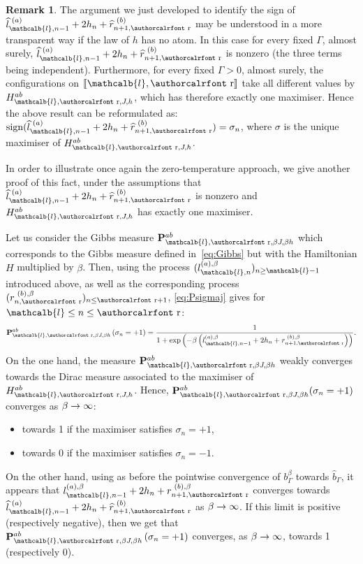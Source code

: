 \documentclass[10pt]{amsart}
\theoremstyle{definition}\newtheorem{defi}[theo]{Definition}\newtheorem{rema}[theo]{Remark}\newtheorem{exam}[theo]{Example}\newtheorem{exem}[theo]{Example}\newtheorem{nota}[theo]{Notation}
\newcommand{\mathcalc}[1]{\text{\authorcalrfont #1}}
\newcommand{\bP}{\mathbf{P}}
\newcommand{\gb}{\beta}
\newcommand{\gG}{\Gamma}
\newcommand{\gs}{\sigma}
\newcommand{\ls}{\widehat{l}}
\newcommand{\rs}{\widehat{r}}
\DeclareMathOperator{\sign}{\mathrm{sign}}
\renewcommand{\ell}{\mathcalb{l}}
\newcommand{\err}{\mathcalc{r}}
\newcommand{\llbracket}{\mathopen{[\mkern -2.7mu[}}
\newcommand{\rrbracket}{\mathclose{]\mkern -2.7mu]}}
\newcommand{\lbra}{\llbracket}
\newcommand{\rbra}{\rrbracket}
\renewcommand*{\to}{\mathchoice{\longrightarrow}{\rightarrow}{\rightarrow}{\rightarrow}}
\begin{document}
\begin{rema}
The argument we just developed to identify the sign of $ \ls_{\ell, n-1}^{\,\,(a)}+2 h_n + \rs_{n+1, \err}^{\,\, (b)}$ may be understood in a more transparent way if the law of $h$ has no atom. In this case for every fixed $\gG$, almost surely, $\ls_{\ell, n-1}^{\,\,(a)}+2 h_n + \rs_{n+1, \err}^{\,\,(b)}$ is nonzero (the three terms being independent). Furthermore, for every fixed $\gG>0$, almost surely, the configurations on $\lbra\ell, \err\rbra$ take all different values by $H_{\ell, \err, J, h}^{ab}$, which has therefore exactly one maximiser. Hence the above result can be reformulated as: $\sign(\ls_{\ell, n-1}^{\,\,(a)}+2 h_n + \rs_{n+1, \err}^{\,\,(b)})=\sigma_n$, where $\sigma$ is the unique maximiser of $H_{\ell, \err, J, h}^{ab}$.

In order to illustrate once again the zero-temperature approach, we give another proof of this fact, under the assumptions that $\ls_{\ell, n-1}^{\,\,(a)}+2 h_n + \rs_{n+1, \err}^{\,\,(b)}$ is nonzero and $H_{\ell, \err, J, h}^{ab}$ has exactly one maximiser.

Let us consider the Gibbs measure $\bP_{\ell, \err, \beta J, \beta h}^{ab}$ which corresponds to the Gibbs measure defined in~\eqref{eq:Gibbs} but with the Hamiltonian $H$ multiplied by $\beta$. Then, using the process $(l_{\ell, n}^{(a), \beta})_{n\ge \ell-1}$ introduced above, as well as the corresponding process $(r_{n,\err}^{\,\,(b), \beta})_{n\le \err+1}$, \eqref{eq:Psigmaj} gives for $\ell\le n\le \err$:
\begin{equation}\label{eq:Psigmajbeta}
\bP_{\ell, \err, \beta J, \beta h}^{ab}\left(\gs_n=+1\right)=
\frac 1 {1+ \exp\left(-\gb\left(l_{\ell,n-1}^{(a),\gb} +2h_n+ r_{n+1, \err}^{\,\,(b),\gb}\right)\right)}.
\end{equation}
On the one hand, the measure $\bP_{\ell, \err, \beta J, \beta h}^{ab}$ weakly converges towards the Dirac measure associated to the maximiser of $H_{\ell, \err, J, h}^{ab}$. Hence, $\bP_{\ell, \err, \beta J, \beta h}^{ab}(\gs_n=+1)$ converges as $\beta\to\infty$:
\begin{itemize}
\item towards 1 if the maximiser satisfies $\sigma_n=+1$,
\item towards 0 if the maximiser satisfies $\sigma_n=-1$.
\end{itemize}
On the other hand, using as before the pointwise convergence of $b_{\gG}^{\beta}$ towards $\widehat{b}_\gG$, it appears that $l_{\ell,n-1}^{(a),\gb} +2h_n+ r_{n+1, \err}^{\,\,(b),\gb}$ converges towards $\ls_{\ell, n-1}^{\,\,(a)}+2 h_n + \rs_{n+1, \err}^{\,\,(b)}$ as $\beta\to \infty$. If this limit is positive (respectively negative), then we get that $\bP_{\ell, \err, \beta J, \beta h}^{ab}\left(\gs_n=+1\right)$ converges, as $\beta\to\infty$, towards 1 (respectively 0).
\end{rema}
\end{document}
